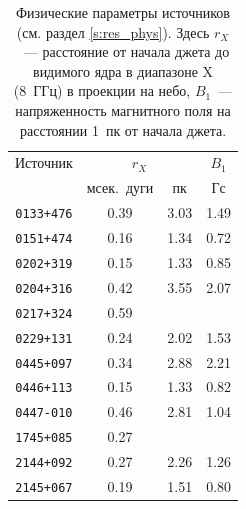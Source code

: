 \begin{table}
 \centering
 \caption{Физические параметры источников (см. раздел \ref{s:res_phys}). Здесь $r_X$~--- расстояние
от начала джета до видимого ядра в диапазоне X (8~ГГц) в проекции на небо, $B_1$~--- напряженность
магнитного поля на расстоянии 1~пк от начала джета.}
 \bigskip
 \label{tab:jet_phys}
\begin{tabular}{|c|c|c|c|}
\hline
    Источник & \multicolumn{2}{c|}{$r_X$} &  $B_1$  \\
    \cline{2-3}
     & мсек.~дуги &  пк &  Гс \\
\hline
 \texttt{0133+476} &   0.39 &  3.03 & 1.49 \\
 \texttt{0151+474} &   0.16 &  1.34 & 0.72 \\
 \texttt{0202+319} &   0.15 &  1.33 & 0.85 \\
 \texttt{0204+316} &   0.42 &  3.55 & 2.07 \\
 \texttt{0217+324} &   0.59 &       &      \\
 \texttt{0229+131} &   0.24 &  2.02 & 1.53 \\
 \texttt{0445+097} &   0.34 &  2.88 & 2.21 \\
 \texttt{0446+113} &   0.15 &  1.33 & 0.82 \\
 \texttt{0447-010} &   0.46 &  2.81 & 1.04 \\
 \texttt{1745+085} &   0.27 &       &      \\
 \texttt{2144+092} &   0.27 &  2.26 & 1.26 \\
 \texttt{2145+067} &   0.19 &  1.51 & 0.80 \\
\hline
\end{tabular}
\end{table}
%
